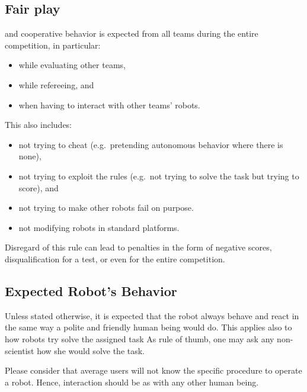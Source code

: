 \subsection{Fair play}
\label{rule:fairplay}
 and cooperative behavior is expected from all teams during the entire competition, in particular:
\begin{itemize}
	\item while evaluating other teams,
	\item while refereeing, and
	\item when having to interact with other teams' robots.
\end{itemize}
This also includes:
\begin{itemize}
	\item not trying to cheat (e.g.~pretending autonomous behavior where there is none),
	\item not trying to exploit the rules (e.g.~not trying to solve the task but trying to score), and
	\item not trying to make other robots fail on purpose.
	\item not modifying robots in standard platforms.
\end{itemize}
Disregard of this rule can lead to penalties in the form of negative scores, disqualification for a test, or even for the entire competition.

\subsection{Expected Robot's Behavior}
Unless stated otherwise, it is expected that the robot always behave and react in the same way a polite and friendly human being would do.
This applies also to how robots try solve the assigned task
As rule of thumb, one may ask any non-scientist how she would solve the task.

Please consider that average users will not know the specific procedure to operate a robot.
Hence, interaction should be as with any other human being.



